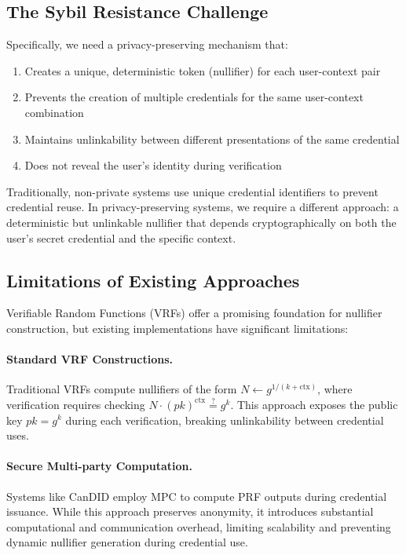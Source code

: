 \subsection{The Sybil Resistance Challenge}

Specifically, we need a privacy-preserving mechanism that:
\begin{enumerate}
    \item Creates a unique, deterministic token (nullifier) for each user-context pair
    \item Prevents the creation of multiple credentials for the same user-context combination
    \item Maintains unlinkability between different presentations of the same credential
    \item Does not reveal the user's identity during verification
\end{enumerate}

Traditionally, non-private systems use unique credential identifiers to prevent credential reuse. In privacy-preserving systems, we require a different approach: a deterministic but unlinkable nullifier that depends cryptographically on both the user's secret credential and the specific context.

\subsection{Limitations of Existing Approaches}

Verifiable Random Functions (VRFs) offer a promising foundation for nullifier construction, but existing implementations have significant limitations:

\paragraph{Standard VRF Constructions.} Traditional VRFs compute nullifiers of the form $N \leftarrow g^{1/(k+\text{ctx})}$, where verification requires checking $N \cdot (pk)^{\text{ctx}} \stackrel{?}{=} g^k$. This approach exposes the public key $pk = g^k$ during each verification, breaking unlinkability between credential uses.

\paragraph{Secure Multi-party Computation.} Systems like CanDID employ MPC to compute PRF outputs during credential issuance. While this approach preserves anonymity, it introduces substantial computational and communication overhead, limiting scalability and preventing dynamic nullifier generation during credential use.

